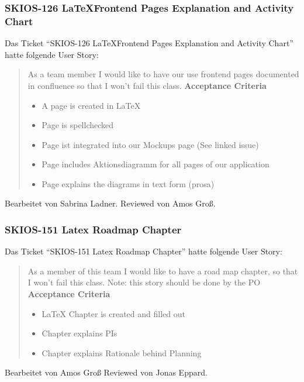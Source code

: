 \subsubsection{SKIOS-126 \LaTeX Frontend Pages Explanation and Activity Chart}
Das Ticket \enquote{SKIOS-126 \LaTeX Frontend Pages Explanation and Activity Chart} hatte folgende User Story:
\begin{quotation}
    As a team member I would like to have our use frontend pages documented in confluence so that I won't fail this class.
\textbf{Acceptance Criteria}
\begin{itemize}
    \item A page is created in LaTeX
    \item Page is spellchecked
    \item Page ist integrated into our Mockups page (See linked issue)
    \item Page includes Aktionsdiagramm for all pages of our application
    \item Page explains the diagrams in text form (prosa)
\end{itemize}
\end{quotation}
Bearbeitet von Sabrina Ladner.
Reviewed von Amos Groß.

\subsubsection{SKIOS-151 Latex Roadmap Chapter}
Das Ticket \enquote{SKIOS-151 Latex Roadmap Chapter} hatte folgende User Story:
\begin{quotation}
    As a member of this team I would like to have a road map chapter, so that I won't fail this class.
    Note: this story should be done by the PO \\
\textbf{Acceptance Criteria}
\begin{itemize}
    \item LaTeX Chapter is created and filled out
    \item Chapter explains PIs
    \item Chapter explains Rationale behind Planning
\end{itemize}
\end{quotation}
Bearbeitet von Amos Groß
Reviewed von Jonas Eppard.

